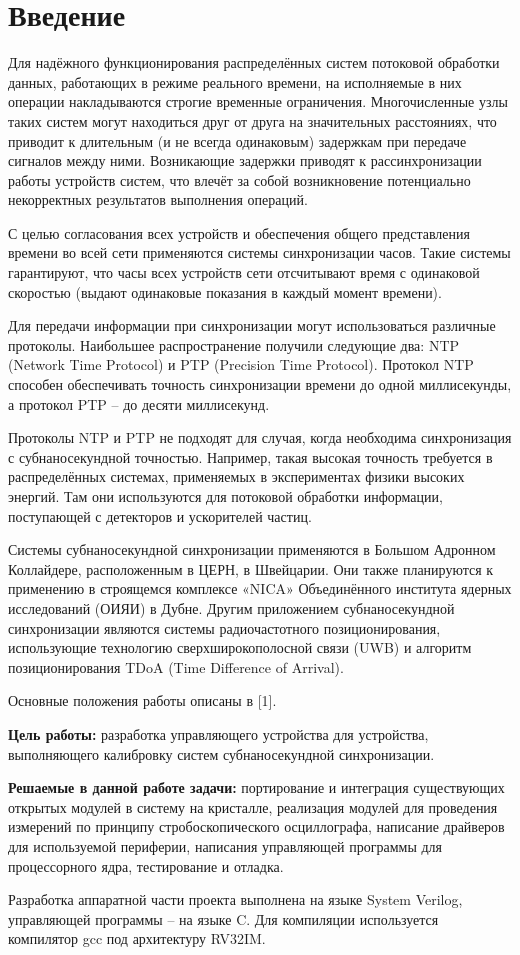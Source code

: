 \chapter*{Введение} %

Для надёжного функционирования распределённых систем потоковой обработки данных, работающих в
режиме реального времени, на исполняемые в них операции накладываются строгие временные ограничения.
Многочисленные узлы таких систем могут находиться друг от друга на значительных расстояниях, 
что приводит к длительным (и не всегда одинаковым) задержкам при передаче сигналов между ними.
Возникающие задержки приводят к рассинхронизации работы устройств систем, что влечёт за собой 
возникновение потенциально некорректных результатов выполнения операций. 

С целью согласования всех устройств и обеспечения общего представления времени во всей сети применяются 
системы синхронизации часов. Такие системы гарантируют, что часы всех устройств сети отсчитывают время с 
одинаковой скоростью (выдают одинаковые показания в каждый момент времени).

Для передачи информации при синхронизации могут использоваться различные протоколы.
Наибольшее распространение получили следующие два: NTP (Network Time Protocol) и PTP (Precision Time Protocol).
Протокол NTP способен обеспечивать точность синхронизации времени до одной миллисекунды, а протокол PTP – до десяти миллисекунд. 

Протоколы NTP и PTP не подходят для случая, когда необходима синхронизация с субнаносекундной точностью. Например, 
такая высокая точность требуется в распределённых системах, применяемых в экспериментах физики высоких энергий.
Там они используются для потоковой обработки информации, поступающей с детекторов и ускорителей частиц. 

Системы субнаносекундной синхронизации применяются в Большом Адронном Коллайдере, расположенным в ЦЕРН, в Швейцарии. Они также
планируются к применению в строящемся комплексе «NICA» Объединённого института ядерных исследований (ОИЯИ) в Дубне. 
Другим приложением субнаносекундной синхронизации являются системы радиочастотного позиционирования,
использующие технологию сверхширокополосной связи (UWB) и алгоритм позиционирования TDoA (Time Difference of Arrival).

Основные положения работы описаны в [1].

\textbf{Цель работы:} разработка управляющего устройства для устройства, выполняющего калибровку систем субнаносекундной синхронизации.

\textbf{Решаемые в данной работе задачи:} портирование и интеграция существующих открытых модулей в систему на кристалле, 
реализация модулей для проведения измерений по принципу стробоскопического осциллографа, написание драйверов для используемой периферии,
написания управляющей программы для процессорного ядра, тестирование и отладка.

Разработка аппаратной части проекта выполнена на языке System Verilog, управляющей программы -- на языке C. 
Для компиляции используется компилятор gcc под архитектуру RV32IM.